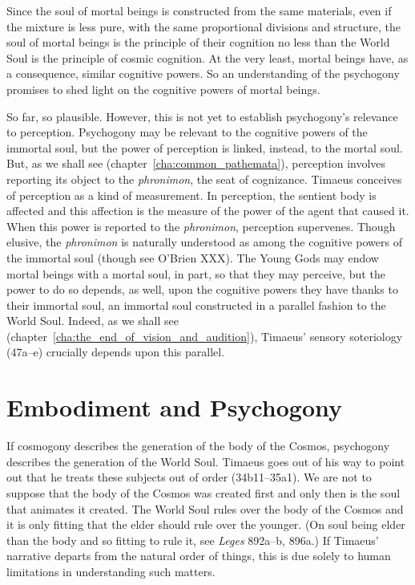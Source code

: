 Since the soul of mortal beings is constructed from the same materials, even if the mixture is less pure, with the same proportional divisions and structure, the soul of mortal beings is the principle of their cognition no less than the World Soul is the principle of cosmic cognition. At the very least, mortal beings have, as a consequence, similar cognitive powers. So an understanding of the psychogony promises to shed light on the cognitive powers of mortal beings.

So far, so plausible. However, this is not yet to establish psychogony's relevance to perception. Psychogony may be relevant to the cognitive powers of the immortal soul, but the power of perception is linked, instead, to the mortal soul. But, as we shall see (chapter~\ref{cha:common_pathemata}), perception involves reporting its object to the \emph{phronimon}, the seat of cognizance. Timaeus conceives of perception as a kind of measurement. In perception, the sentient body is affected and this affection is the measure of the power of the agent that caused it. When this power is reported to the \emph{phronimon}, perception supervenes. Though elusive, the \emph{phronimon} is naturally understood as among the cognitive powers of the immortal soul (though see O'Brien XXX). The Young Gods may endow mortal beings with a mortal soul, in part, so that they may perceive, but the power to do so depends, as well, upon the cognitive powers they have thanks to their immortal soul, an immortal soul constructed in a parallel fashion to the World Soul. Indeed, as we shall see (chapter~\ref{cha:the_end_of_vision_and_audition}), Timaeus' sensory soteriology (47a--e) crucially depends upon this parallel.



\section{Embodiment and Psychogony} %
\label{sec:embodiment_and_psychogony}

If cosmogony describes the generation of the body of the Cosmos, psychogony describes the generation of the World Soul. Timaeus goes out of his way to point out that he treats these subjects out of order (34b11--35a1). We are not to suppose that the body of the Cosmos was created first and only then is the soul that animates it created. The World Soul rules over the body of the Cosmos and it is only fitting that the elder should rule over the younger. (On soul being elder than the body and so fitting to rule it, see \emph{Leges} 892a--b, 896a.) If Timaeus' narrative departs from the natural order of things, this is due solely to human limitations in understanding such matters.

